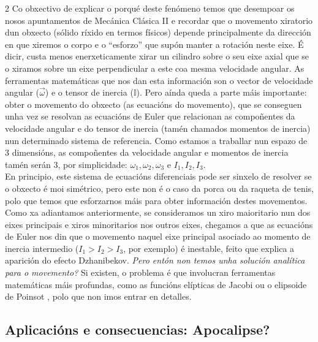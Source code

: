 \begin{refsection}
\begin{multicols}{2}
Co obxectivo de explicar o porqué deste fenómeno temos que desempoar os nosos
apuntamentos de Mecánica Clásica II e recordar que o movemento xiratorio dun
obxecto (sólido ríxido en termos físicos) depende principalmente da dirección
en que xiremos o corpo e o ``esforzo'' que supón manter a rotación neste eixe.
É dicir, custa menos enerxeticamente xirar un cilindro sobre o seu eixe axial
que se o xiramos sobre un eixe perpendicular a este coa mesma velocidade
angular. As ferramentas matemáticas que nos dan esta información son o vector
de velocidade angular ($\vec{\omega}$) e o tensor de inercia ($\mathbb{I}$).
Pero aínda queda a parte máis importante: obter o movemento do obxecto (as
ecuacións do movemento), que se conseguen unha vez se resolvan as ecuacións de
Euler que relacionan as compoñentes da velocidade angular e do tensor de
inercia (tamén chamados momentos de inercia) nun determinado sistema de
referencia. Como estamos a traballar nun espazo de 3 dimensións, as compoñentes
da velocidade angular e momentos de inercia tamén serán 3, por simplicidade:
$\omega_1, \omega_2, \omega_3$ e $I_1, I_2, I_3$.\\

En principio, este sistema de ecuacións diferenciais pode ser sinxelo de
resolver se o obxecto é moi simétrico, pero este non é o caso da porca ou da
raqueta de tenis, polo que temos que esforzarnos máis para obter información
destes movementos. Como xa adiantamos anteriormente, se consideramos un xiro
maioritario nun dos eixes principais e xiros minoritarios nos outros eixes,
chegamos a que as ecuacións de Euler nos din que o movemento naquel eixe
principal asociado ao momento de inercia intermedio ($I_1>I_2>I_3$, por
exemplo) é inestable, feito que explica a aparición do efecto Dzhanibekov.
\textit{Pero entón non temos unha solución analítica para o movemento?} Si
existen, o problema é que involucran ferramentas matemáticas máis profundas,
como as funcións elípticas de Jacobi \cite{RouthDynamics} ou o elipsoide de
Poinsot \cite{VanDamme2017}, polo que non imos entrar en detalles.

\subsection*{Aplicacións e consecuencias: Apocalipse?}


\end{multicols}
\end{refsection}
